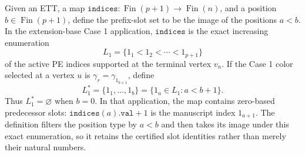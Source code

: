 \begin{definition}
Given an ETT, a map
\(\mathtt{indices}:\operatorname{Fin}(p+1)\to\operatorname{Fin}(n)\),
and a position \(b\in\operatorname{Fin}(p+1)\), define the prefix-slot
set to be the image of the positions \(a<b\).  In the extension-base
Case 1 application, \(\mathtt{indices}\) is the exact increasing
enumeration
\[
                  L_1=\{1_1<1_2<\cdots<1_{p+1}\}
\]
of the active PE indices supported at the terminal vertex \(v_n\).  If the Case 1 color selected at a vertex
\(u\) is \(\gamma_r=\gamma_{1_{b+1}}\), define
\[
             L_1^*=\{1_1,\ldots,1_b\}
                  =\{1_a\in L_1:a<b+1\}.
\]
Thus \(L_1^*=\varnothing\) when \(b=0\).  In that application, the map
contains zero-based predecessor slots: \(\mathtt{indices}(a).\mathtt{val}+1\)
is the manuscript index \(1_{a+1}\).  The definition filters the position
type by \(a<b\) and then takes its image under this exact enumeration, so
it retains the certified slot identities rather than merely their natural
numbers.
\end{definition}
